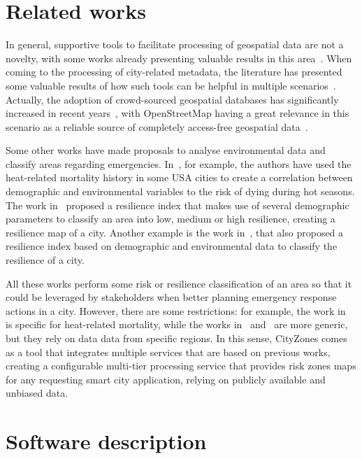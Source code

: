 \begin{refsection}
\section{Related works}

In general, supportive tools to facilitate processing of geospatial data are not a novelty, with some works already presenting valuable results in this area~\cite{geospatial1,geospatial2,simulationflood}. When coming to the processing of city-related metadata, the literature has presented some valuable results of how such tools can be helpful in multiple scenarios~\cite{geospatial3,geospatial4}. Actually, the adoption of crowd-sourced geospatial databases has significantly increased in recent years~\cite{geospatial5,geospatial6}, with OpenStreetMap having a great relevance in this scenario as a reliable source of completely access-free geospatial data~\cite{osm}.

Some other works have made proposals to analyse environmental data and classify areas regarding emergencies. In~\cite{classificacao1_calor}, for example, the authors have used the heat-related mortality history in some USA cities to create a correlation between demographic and environmental variables to the risk of dying during hot seasons. The work in~\cite{classificacao2_clima} proposed a resilience index that makes use of several demographic parameters to classify an area into low, medium or high resilience, creating a resilience map of a city. Another example is the work in~\cite{classificacao3_redi}, that also proposed a resilience index based on demographic and environmental data to classify the resilience of a city.

All these works perform some risk or resilience classification of an area so that it could be leveraged by stakeholders when better planning emergency response actions in a city. However, there are some restrictions: for example, the work in~\cite{classificacao1_calor} is specific for heat-related mortality, while the works in~\cite{classificacao2_clima} and~\cite{classificacao3_redi} are more generic, but they rely on data data from specific regions. In this sense, CityZones comes as a tool that integrates multiple services that are based on previous works, creating a configurable multi-tier processing service that provides risk zones maps for any requesting smart city application, relying on publicly available and unbiased data.

\section{Software description}


\end{refsection}
